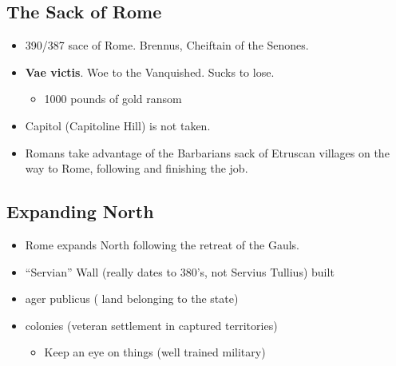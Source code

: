 \documentclass[12pt, twoside]{article}
\begin{document}
\subsection{The Sack of Rome}
\begin{itemize}
\item 390/387 sace of Rome.  Brennus, Cheiftain of the Senones.
\item \textbf{Vae victis}.  Woe to the Vanquished.  Sucks to lose.
	\begin{itemize}
	\item 1000 pounds of gold ransom 
	\end{itemize}
\item Capitol (Capitoline Hill) is not taken.
\item Romans take advantage of the Barbarians sack of Etruscan villages on the way to Rome, following and finishing the job.
\end{itemize}

\subsection{Expanding North}
\begin{itemize}
\item Rome expands North following the retreat of the Gauls.
\item “Servian” Wall (really dates to 380's, not Servius Tullius) built
\item ager publicus ( land belonging to the state)
\item colonies (veteran settlement in captured territories)
	\begin{itemize}
	\item Keep an eye on things (well trained military)
	\end{itemize}
\end{itemize}
\end{document}
